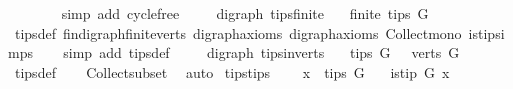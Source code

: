 \begin{isabellebody}
\ \ \ \ \ \ \isamarkupfalse%
\ {\isacharparenleft}{\kern0pt}simp\ add{\isacharcolon}{\kern0pt}\ cycle{\isacharunderscore}{\kern0pt}free{\isacharparenright}{\kern0pt}\isanewline
\ \ \isamarkupfalse%
%
\endisatagproof
{\isafoldproof}%
%
\isadelimproof
\isanewline
%
\endisadelimproof
\isanewline
{}\isamarkupfalse%
\ {\isacharparenleft}{\kern0pt}\ digraph{\isacharparenright}{\kern0pt}\ tips{\isacharunderscore}{\kern0pt}finite{\isacharcolon}{\kern0pt}\isanewline
\ \ \ {\isachardoublequoteopen}finite\ {\isacharparenleft}{\kern0pt}tips\ G{\isacharparenright}{\kern0pt}{\isachardoublequoteclose}\isanewline
%
\isadelimproof
\ \ %
\endisadelimproof
%
\isatagproof
{}\isamarkupfalse%
\ tips{\isacharunderscore}{\kern0pt}def\ fin{\isacharunderscore}{\kern0pt}digraph{\isachardot}{\kern0pt}finite{\isacharunderscore}{\kern0pt}verts\ digraph{\isachardot}{\kern0pt}axioms{\isacharparenleft}{\kern0pt}{}{\isacharparenright}{\kern0pt}\ digraph{\isacharunderscore}{\kern0pt}axioms\ Collect{\isacharunderscore}{\kern0pt}mono\ is{\isacharunderscore}{\kern0pt}tip{\isachardot}{\kern0pt}simps\isanewline
\ \ \isamarkupfalse%
\ {\isacharparenleft}{\kern0pt}simp\ add{\isacharcolon}{\kern0pt}\ tips{\isacharunderscore}{\kern0pt}def{\isacharparenright}{\kern0pt}%
\endisatagproof
{\isafoldproof}%
%
\isadelimproof
\isanewline
%
\endisadelimproof
\ \ \isanewline
{}\isamarkupfalse%
\ {\isacharparenleft}{\kern0pt}\ digraph{\isacharparenright}{\kern0pt}\ tips{\isacharunderscore}{\kern0pt}in{\isacharunderscore}{\kern0pt}verts{\isacharcolon}{\kern0pt}\isanewline
\ \ \ {\isachardoublequoteopen}tips\ G\ {\isasymsubseteq}\ \ verts\ G{\isachardoublequoteclose}%
\isadelimproof
\ \ %
\endisadelimproof
%
\isatagproof
{}\isamarkupfalse%
\ tips{\isacharunderscore}{\kern0pt}def\isanewline
\ \ \isamarkupfalse%
\ Collect{\isacharunderscore}{\kern0pt}subset\ \isamarkupfalse%
\ auto%
\endisatagproof
{\isafoldproof}%
%
\isadelimproof
%
\endisadelimproof
\isanewline
\isanewline
{}\isamarkupfalse%
\ tips{\isacharunderscore}{\kern0pt}tips{\isacharcolon}{\kern0pt}\ \isanewline
\ \ \ {\isachardoublequoteopen}x\ {\isasymin}\ tips\ G{\isachardoublequoteclose}\isanewline
\ \ \ {\isachardoublequoteopen}is{\isacharunderscore}{\kern0pt}tip\ G\ x{\isachardoublequoteclose}%
\isadelimproof
\ %
\endisadelimproof
%
\isatagproof
{}\isamarkupfalse%

\end{isabellebody}
